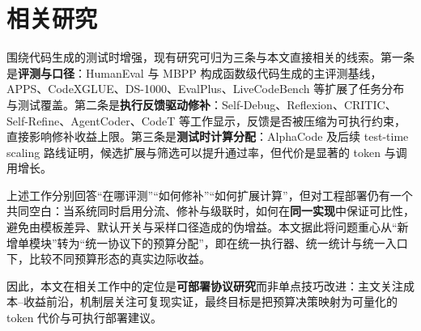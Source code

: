 \section{相关研究}

围绕代码生成的测试时增强，现有研究可归为三条与本文直接相关的线索。第一条是\textbf{评测与口径}：HumanEval 与 MBPP 构成函数级代码生成的主评测基线\cite{chen2021evaluating,austin2021program}，APPS、CodeXGLUE、DS-1000、EvalPlus、LiveCodeBench 等扩展了任务分布与测试覆盖\cite{hendrycks2021apps,lu2021codexglue,lai2023ds1000,liu2023evalplus,jain2024livecodebench}。第二条是\textbf{执行反馈驱动修补}：Self-Debug、Reflexion、CRITIC、Self-Refine、AgentCoder、CodeT 等工作显示，反馈是否被压缩为可执行约束，直接影响修补收益上限\cite{chen2024selfdebug,shinn2023reflexion,gou2024critic,madaan2023selfrefine,huang2024agentcoder,chen2023codet}。第三条是\textbf{测试时计算分配}：AlphaCode 及后续 test-time scaling 路线证明，候选扩展与筛选可以提升通过率，但代价是显著的 token 与调用增长\cite{li2022alphacode,li2025sstar}。

上述工作分别回答“在哪评测”“如何修补”“如何扩展计算”，但对工程部署仍有一个共同空白：当系统同时启用分流、修补与级联时，如何在\textbf{同一实现}中保证可比性，避免由模板差异、默认开关与采样口径造成的伪增益。本文据此将问题重心从“新增单模块”转为“统一协议下的预算分配”，即在统一执行器、统一统计与统一入口下，比较不同预算形态的真实边际收益。

因此，本文在相关工作中的定位是\textbf{可部署协议研究}而非单点技巧改进：主文关注成本--收益前沿，机制层关注可复现实证，最终目标是把预算决策映射为可量化的 token 代价与可执行部署建议。